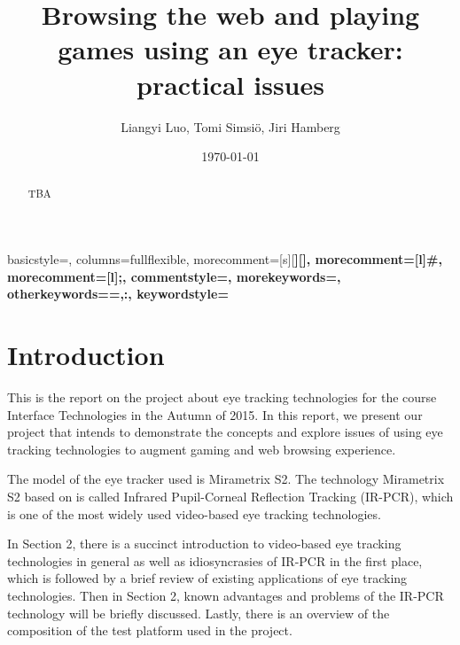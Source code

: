 \documentclass[english]{tktltiki}
\begin{document}
\onehalfspacing

{
    basicstyle=\ttfamily\small\singlespacing,
    columns=fullflexible,
    morecomment=[s][\color{Orchid}\bfseries]{[}{]},
    morecomment=[l]{\#},
    morecomment=[l]{;},
    commentstyle=\color{gray}\ttfamily,
    morekeywords={},
    otherkeywords={=,:},
    keywordstyle={\color{red}\bfseries}
}

\title{Browsing the web and playing games using an eye tracker: practical issues}
\author{Liangyi Luo, Tomi Simsiö, Jiri Hamberg }
\date{\today}

\maketitle


\keywords{ }

\begin{abstract}

TBA

\end{abstract}

\mytableofcontents




\section{Introduction}

This is the report on the project about eye tracking technologies for the course Interface Technologies in the Autumn of 2015. In this report, we present our project that intends to demonstrate the concepts and explore issues of using eye tracking technologies to augment gaming and web browsing experience.  

The model of the eye tracker used is Mirametrix S2. The technology Mirametrix S2 based on is called Infrared Pupil-Corneal Reflection Tracking (IR-PCR), which is one of the most widely used video-based eye tracking technologies. 

In Section 2, there is a succinct introduction to video-based eye tracking technologies in general as well as idiosyncrasies of IR-PCR in the first place, which is followed by a brief review of existing applications of eye tracking technologies. Then in Section 2, known advantages and problems of the IR-PCR technology will be briefly discussed. Lastly, there is an overview of the composition of the test platform used in the project.
\end{document}
